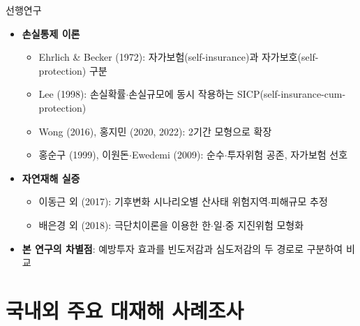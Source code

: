 \documentclass[aspectratio=169,10pt]{beamer}
\begin{document}
\begin{frame}{선행연구}
  \begin{itemize}
    \item \textbf{손실통제 이론}
    \begin{itemize}\small
      \item Ehrlich \& Becker (1972): 자가보험(self-insurance)과 자가보호(self-protection) 구분
      \item Lee (1998): 손실확률$\cdot$손실규모에 동시 작용하는 SICP(self-insurance-cum-protection)
      \item Wong (2016), 홍지민 (2020, 2022): 2기간 모형으로 확장
      \item 홍순구 (1999), 이원돈$\cdot$Ewedemi (2009): 순수$\cdot$투자위험 공존, 자가보험 선호
    \end{itemize}
    \item \textbf{자연재해 실증}
    \begin{itemize}\small
      \item 이동근 외 (2017): 기후변화 시나리오별 산사태 위험지역$\cdot$피해규모 추정
      \item 배은경 외 (2018): 극단치이론을 이용한 한$\cdot$일$\cdot$중 지진위험 모형화
    \end{itemize}
    \item \textbf{본 연구의 차별점}: 예방투자 효과를 \alert{빈도저감}과 \alert{심도저감}의 두 경로로 구분하여 비교
  \end{itemize}
\end{frame}

\section{국내외 주요 대재해 사례조사}
\end{document}
